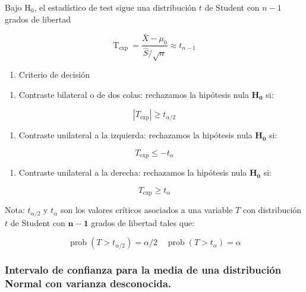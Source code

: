 \documentclass[
]{article}
\providecommand{\tightlist}{%
  \setlength{\itemsep}{0pt}\setlength{\parskip}{0pt}}
\begin{document}
Bajo \(\mathrm{H}_{0}\), el estadístico de test sigue una distribución \(t\) de Student con \(n-1\) grados de libertad

\[
\mathrm{T}_{\text {exp }}=\frac{\bar{X}-\mu_{0}}{\hat{S} / \sqrt{n}} \approx t_{n-1}
\]

\begin{enumerate}
\def\labelenumi{\arabic{enumi})}
\setcounter{enumi}{2}
\tightlist
\item
  Criterio de decisión
\end{enumerate}

\begin{enumerate}
\def\labelenumi{\alph{enumi})}
\tightlist
\item
  Contraste bilateral o de dos colas: rechazamos la hipótesis nula \(\mathbf{H}_{\mathbf{0}}\) si:
\end{enumerate}

\[
\left|T_{\exp }\right| \geq t_{\alpha / 2}
\]

\begin{enumerate}
\def\labelenumi{\alph{enumi})}
\setcounter{enumi}{1}
\tightlist
\item
  Contraste unilateral a la izquierda: rechazamos la hipótesis nula \(\mathbf{H}_{\mathbf{0}}\) si:
\end{enumerate}

\[
T_{\exp } \leq-t_{\alpha}
\]

\begin{enumerate}
\def\labelenumi{\alph{enumi})}
\setcounter{enumi}{2}
\tightlist
\item
  Contraste unilateral a la derecha: rechazamos la hipótesis nula \(\mathbf{H}_{\mathbf{0}}\) si:
\end{enumerate}

\[
T_{\mathrm{exp}} \geq t_{\alpha}
\]

Nota: \(t_{\alpha / 2}\) y \(t_{\alpha}\) son los valores críticos asociados a una variable \(T\) con distribución \(t\) de Student con \(\boldsymbol{n}-\mathbf{1}\) grados de libertad tales que:

\[
\operatorname{prob}\left(T>t_{\alpha / 2}\right)=\alpha / 2 \quad \operatorname{prob}\left(T>t_{\alpha}\right)=\alpha
\]

\subsubsection{Intervalo de confianza para la media de una distribución Normal con varianza desconocida.}\label{intervalo-de-confianza-para-la-media-de-una-distribuciuxf3n-normal-con-varianza-desconocida.}
\end{document}
